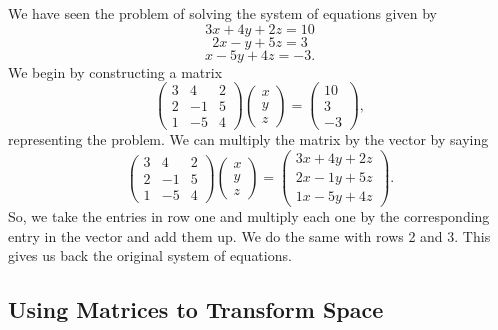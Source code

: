 \documentclass[
]{book}
\theoremstyle{definition}
\theoremstyle{definition}
\theoremstyle{definition}
\theoremstyle{definition}
\theoremstyle{remark}
\begin{document}
We have seen the problem of solving the system of equations given by
\[3x + 4y + 2z= 10\] \[2x - y + 5z= 3\] \[x-5y + 4z = -3.\]
We begin by constructing a matrix \[\begin{pmatrix}3 & 4 & 2\\ 2 & -1 & 5\\ 1 & -5 & 4 \end{pmatrix} \begin{pmatrix}x \\ y \\ z \end{pmatrix} = \begin{pmatrix}10 \\ 3 \\ -3 \end{pmatrix},\] representing the problem. We can multiply the matrix by the vector by saying \[\begin{pmatrix}3 & 4 & 2\\ 2 & -1 & 5\\ 1 & -5 & 4 \end{pmatrix} \begin{pmatrix}x \\ y \\ z \end{pmatrix} = \begin{pmatrix}3x+ 4y +2z\\ 2x -1y +5z\\ 1x-5y +4z \end{pmatrix}.\] So, we take the entries in row one and multiply each one by the corresponding entry in the vector and add them up. We do the same with rows 2 and 3. This gives us back the original system of equations.

\hypertarget{using-matrices-to-transform-space}{%
\subsection{Using Matrices to Transform Space}\label{using-matrices-to-transform-space}}
\end{document}
